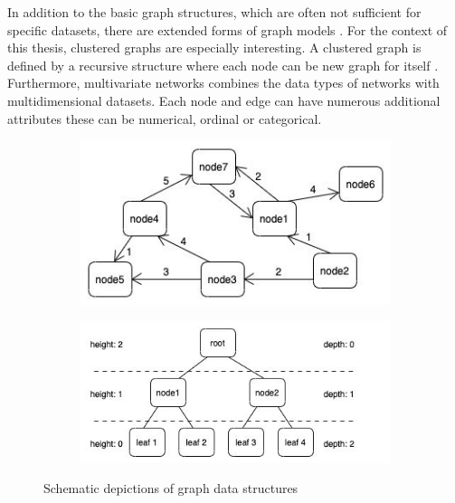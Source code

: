 In addition to the basic graph structures, which are often not sufficient for specific datasets, there are extended forms of graph models \cite{bertault_algorithm_1999}. 
For the context of this thesis, clustered graphs are especially interesting. A clustered graph is defined by a recursive structure where each node can be new graph for itself \cite{eades_multilevel_1997}.\\ 
Furthermore, multivariate networks \cite{kerren_introduction_2014} combines the data types of networks with multidimensional datasets. Each node and edge can have numerous additional attributes these can be numerical, ordinal or categorical.

\begin{figure}[h]
    \centering
    \begin{subfigure}[b]{0.45\columnwidth}
        \centering
        \includegraphics[width=\textwidth]{graphics/weightedDirectedNetwork.jpg}
        \label{fig:simple_weighted_directed_network}
    \end{subfigure}
    \begin{subfigure}[b]{0.54\columnwidth}
        \centering
        \includegraphics[width=\textwidth]{graphics/basicTree.jpg}
        \label{fig:simple_tree}
    \end{subfigure}
    
    \caption[Optional caption for the figure list (often used to abbreviate long captions)]{Schematic depictions of graph data structures} %
    \label{fig:intro} 
  \end{figure}

